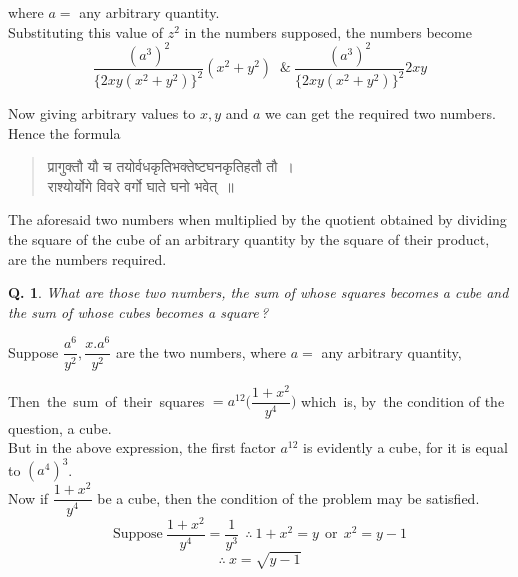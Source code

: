 \documentclass[11pt, openany]{book}
\newtheorem{question}{Q.}
\begin{document}
\noindent where $a =$ any arbitrary quantity. \\
Substituting this value of $z^{2}$ in the numbers supposed, the numbers become
\begin{equation*}
 \dfrac{(a^{3})^{2}}{\{2xy (x^{2} + y^{2})\}^{2}}(x^{2} + y^{2})\;\; \&\ \dfrac{(a^{3})^{2}}{\{2xy (x^{2} + y^{2})\}^{2}}2xy
 \end{equation*}

 Now giving arbitrary values to $x, y$ and $a$ we can get the 
required two numbers. \\

\vspace{-2mm}
 Hence the formula\textemdash\ 
\begin{quote}
    \qt 
     प्रागुक्तौ यौ च तयोर्वधकृतिभक्तेष्टघनकृतिहतौ तौ~। \\
 राश्योर्योगे विवरे वर्गो घाते घनो भवेत्~॥~
\end{quote}

 The aforesaid two numbers when multiplied by the 
quotient obtained by dividing the square of the cube of an 
arbitrary quantity by the square of their product, are the 
numbers required. 
\begin{question}
  What are those two numbers, the sum of whose 
squares becomes a cube and the sum of whose cubes becomes 
a square\,? 
\end{question} 

 Suppose $\dfrac{a^{6}}{y^{2}}, \dfrac{x.a^{6}}{y^{2}}$ are the two numbers,
where 
$a =$ any arbitrary quantity, 

 Then \,the \,sum \,of \,their \,squares $= a^{12}\bigg(\dfrac{1 + x^{2}}{y^{4}}\bigg)$ which
\,is, by \,the condition of the question, a cube. \\

\vspace{-2mm}
 But in the above expression, the first factor $a^{12}$ is 
evidently a cube, for it is equal to $(a^{4})^{3}$. \\

\vspace{-2mm}
 Now if $\dfrac{1 + x^{2}}{y^{4}}$ be a cube, then the condition of the 
problem may be satisfied. 
\newpage
\begin{equation*}
    \text{Suppose}\ \dfrac{1+x^{2}}{y^{4}} = \dfrac{1}{y^{3}}~~ \therefore\ 1+x^{2} = y~~ \text{or}~~ x^{2} = y - 1
\end{equation*}
\begin{equation*}
    \therefore\ x = \sqrt{y - 1}
\end{equation*}
 
\end{document}
